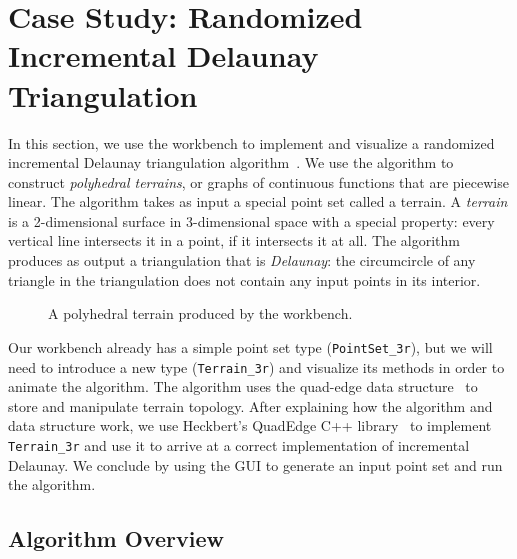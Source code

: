 
\FloatBarrier
\section{Case Study: Randomized Incremental Delaunay Triangulation}
\label{sec:case-delaunay}

In this section, we use the workbench to implement and visualize a randomized
incremental Delaunay triangulation algorithm~\cite{lischinski1994incremental}.
We use the algorithm to construct \emph{polyhedral terrains}, or graphs of
continuous functions that are piecewise linear. The algorithm takes as input a
special point set called a terrain. A \emph{terrain} is a 2-dimensional surface
in 3-dimensional space with a special property: every vertical line intersects
it in a point, if it intersects it at all. The algorithm produces as output a
triangulation that is \emph{Delaunay}: the circumcircle of any triangle in the
triangulation does not contain any input points in its interior. 

\begin{figure}[htb]
\centering
{} 
\caption{A polyhedral terrain produced by the workbench.}
\label{fig:terrain-intro} 
\end{figure}

Our workbench already has a simple point set type
(\texttt{PointSet\_3r}), but we will need to introduce a new type 
(\texttt{Terrain\_3r}) and visualize its methods in order to animate the
algorithm. The algorithm uses the quad-edge data
structure~\cite{guibas1985primitives} to store and manipulate terrain topology.
After explaining how the algorithm and data structure work, we use Heckbert's
QuadEdge C++ library~\cite{heckbert} to implement \texttt{Terrain\_3r} and use
it to arrive at a correct implementation of incremental Delaunay. We conclude by
using the GUI to generate an input point set and run the algorithm.


\subsection{Algorithm Overview}

